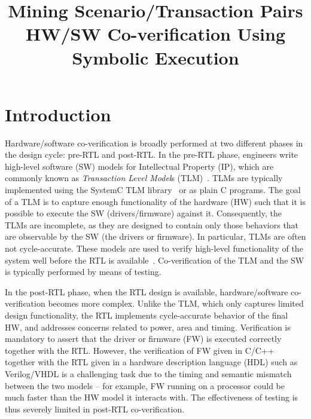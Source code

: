 \documentclass[sigconf]{acmart}
\title{Mining Scenario/Transaction Pairs HW/SW Co-verification Using Symbolic Execution}
\begin{document}
\renewcommand\footnotetextcopyrightpermission[1]{} %
\pagestyle{plain} %

\maketitle

%
\section{Introduction}
Hardware/software co-verification is broadly performed at two different
phases in the design cycle: pre-RTL and post-RTL.  In the pre-RTL phase,
engineers write high-level software (SW) models for Intellectual Property (IP), 
which are commonly known as {\em Transaction Level Model}s
(TLM)~\cite{codes14}.  TLMs are typically implemented using the SystemC TLM
library~\cite{tlm} or as plain C programs.  The goal of a TLM is to capture
enough functionality of the hardware (HW) such that it is possible to execute the
SW (drivers/firmware) against it.  Consequently, the TLMs are
incomplete, as they are designed to contain only those behaviors that are
observable by the SW (the drivers or firmware).  In particular, TLMs
are often not cycle-accurate.  These models are used to verify high-level
functionality of the system well before the RTL is
available~\cite{codes14,codes15}. Co-verification of the TLM and the
SW is typically performed by means of testing.

In the post-RTL phase, when the RTL design is available, hardware/software
co-verification becomes more complex.  Unlike the TLM, which only captures
limited design functionality, the RTL implements cycle-accurate behavior
of the final HW, and addresses concerns related to power, area and
timing.  Verification is mandatory to assert that the driver or firmware (FW) 
is executed correctly together with the RTL.  However, the verification of
FW given in C/C++ together with the RTL given in a hardware
description language (HDL) such as Verilog/VHDL is a challenging task due to
the timing and semantic mismatch between the two models -- for example,
FW running on a processor could be much faster than the HW
model it interacts with.  The effectiveness of testing is
thus severely limited in post-RTL co-verification.
\end{document}
